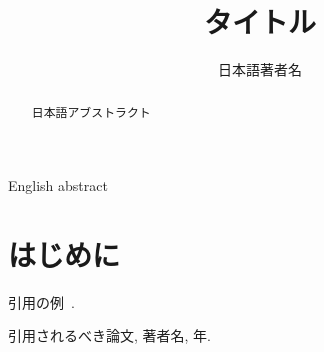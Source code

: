 \documentclass[submit]{ipsj}
\title{タイトル}
\author{日本語著者名}{英文著者名}{univ1}[your@mail.address.example.com]
\begin{document}
\begin{abstract} 日本語アブストラクト
\end{abstract}
\begin{eabstract} English abstract
\end{eabstract}
\maketitle
\thispagestyle{empty}
\section{はじめに}
引用の例~\cite{ronbun}.
\begin{thebibliography}{10}
 引用されるべき論文, 著者名, 年.
\end{thebibliography}
\end{document}
